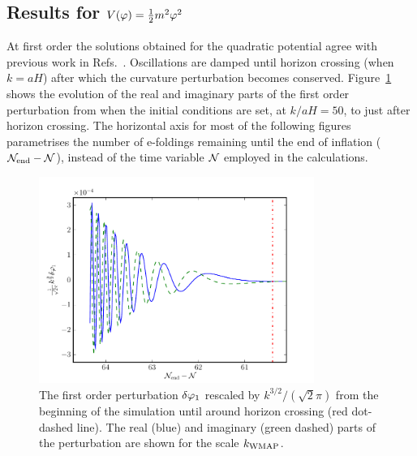 \subsection{Results for \texorpdfstring{$V(\varphi)=\frac{1}{2} m^2 \varphi^2$}{m-squared Model}}
\label{sec:msqphisq-res}

At first order the solutions obtained for the quadratic potential agree with previous
work in
Refs.~\cite{Salopek:1988qh, Martin:2006rs, Ringeval:2007am}. Oscillations
are damped until horizon crossing (when $k=aH$) after which the
curvature perturbation becomes conserved. Figure~\ref{fig:dp1} shows the evolution of
the real and imaginary parts of the first order perturbation from
when the initial conditions are set, at $k/aH=50$, to just after horizon
crossing. The horizontal axis for most of the following figures parametrises the
number of e-foldings remaining until the end of inflation ($\mathcal{N}_\mathrm{end}-\mathcal{N}$),
instead
of the time variable $\mathcal{N}$ employed in the calculations.

% 
\begin{figure}[htbp]
 \centering
 \includegraphics[width=0.8\textwidth]{numerical/graphs/dp1_kwmap}
 \caption[First Order Perturbation]{The first order perturbation $\delta\varphi_{1}$ rescaled by
$k^{3/2}/(\sqrt{2}\pi)$ from the beginning of the simulation until around
horizon crossing (red dot-dashed line). The real (blue) and imaginary (green
dashed) parts of the perturbation are shown for the scale $k_\mathrm{WMAP}$.}
\label{fig:dp1}
\end{figure}
% 

